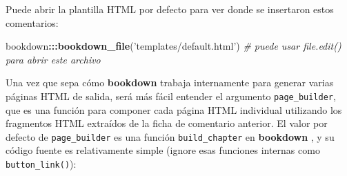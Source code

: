 \documentclass[12pt,]{krantz}
\makeatletter
\newenvironment{Shaded}{\begin{snugshade}}{\end{snugshade}}
\newcommand{\KeywordTok}[1]{\textcolor[rgb]{0.13,0.29,0.53}{\textbf{#1}}}
\newcommand{\DataTypeTok}[1]{\textcolor[rgb]{0.13,0.29,0.53}{#1}}
\newcommand{\CharTok}[1]{\textcolor[rgb]{0.31,0.60,0.02}{#1}}
\newcommand{\StringTok}[1]{\textcolor[rgb]{0.31,0.60,0.02}{#1}}
\newcommand{\CommentTok}[1]{\textcolor[rgb]{0.56,0.35,0.01}{\textit{#1}}}
\newcommand{\ControlFlowTok}[1]{\textcolor[rgb]{0.13,0.29,0.53}{\textbf{#1}}}
\newcommand{\OperatorTok}[1]{\textcolor[rgb]{0.81,0.36,0.00}{\textbf{#1}}}
\newcommand{\NormalTok}[1]{#1}
\newenvironment{kframe}{%
\medskip{}
\setlength{\fboxsep}{.8em}
 \def\at@end@of@kframe{}%
 \ifinner\ifhmode%
  \def\at@end@of@kframe{\end{minipage}}%
  \begin{minipage}{\columnwidth}%
 \fi\fi%
 \def\FrameCommand##1{\hskip\@totalleftmargin \hskip-\fboxsep
 \colorbox{shadecolor}{##1}\hskip-\fboxsep
     \hskip-\linewidth \hskip-\@totalleftmargin \hskip\columnwidth}%
 \MakeFramed {\advance\hsize-\width
   \@totalleftmargin\z@ \linewidth\hsize
   \@setminipage}}%
 {\par\unskip\endMakeFramed%
 \at@end@of@kframe}
\renewenvironment{Shaded}{\begin{kframe}}{\end{kframe}}
\theoremstyle{definition}
\theoremstyle{definition}
\theoremstyle{definition}
\theoremstyle{remark}
\makeatother
\begin{document}
Puede abrir la plantilla HTML por defecto para ver donde se insertaron
estos comentarios:

\begin{Shaded}
\begin{Highlighting}[]
\NormalTok{bookdown}\OperatorTok{:::}\KeywordTok{bookdown_file}\NormalTok{(}\StringTok{'templates/default.html'}\NormalTok{)}
\CommentTok{# puede usar file.edit() para abrir este archivo}
\end{Highlighting}
\end{Shaded}

Una vez que sepa cómo \textbf{bookdown} trabaja internamente para
generar varias páginas HTML de salida, será más fácil entender el
argumento \texttt{page\_builder}, que es una función para componer cada
página HTML individual utilizando los fragmentos HTML extraídos de la
ficha de comentario anterior. El valor por defecto de
\texttt{page\_builder} es una función \texttt{build\_chapter} en
\textbf{bookdown} , y su código fuente es relativamente simple (ignore
esas funciones internas como \texttt{button\_link()}):

\begin{Shaded}
\end{Shaded}
\end{document}
